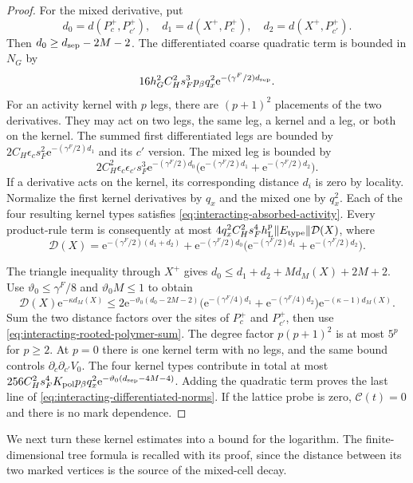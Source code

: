 \begin{proof}
For the mixed derivative, put
\[
 d_0=d(P_c^+,P_{c'}^+),\quad
 d_1=d(X^+,P_c^+),\quad d_2=d(X^+,P_{c'}^+).
\]
Then $d_0\ge d_{\rm sep}-2M-2$.
The differentiated coarse quadratic term is
bounded in $N_G$ by
\[
 16h_G^2C_H^2s_F^3p_\beta q_x^2
                                      \mathrm e^{-(\gamma^F/2)d_{\rm sep}}.
\]
For an activity kernel with $p$ legs, there
are $(p+1)^2$ placements of the two derivatives.
They may act on two legs, the same leg, a
kernel and a leg, or both on the kernel.
The summed first differentiated legs are
bounded by $2C_H\epsilon_cs_F^2\mathrm e^{-(\gamma^F/2)d_1}$
and its $c'$ version. The mixed leg is
bounded by
\[
 2C_H^2\epsilon_c\epsilon_{c'}s_F^3\mathrm e^{-(\gamma^F/2)d_0}
       \bigl(\mathrm e^{-(\gamma^F/2)d_1}+\mathrm e^{-(\gamma^F/2)d_2}\bigr).
\]
If a derivative acts on the kernel, its
corresponding distance $d_i$ is zero by
locality. Normalize the first kernel
derivatives by $q_x$ and the mixed one by
$q_x^2$. Each of the four resulting kernel
types satisfies \eqref{eq:interacting-absorbed-activity}.
Every product-rule term is consequently at most
$4q_x^2C_H^2s_F^4h_{\rm L}^p\|E_{\rm type}\|\mathcal D(X)$,
where
\[
 \mathcal D(X)=\mathrm e^{-(\gamma^F/2)(d_1+d_2)}
       +\mathrm e^{-(\gamma^F/2)d_0}
                  \bigl(\mathrm e^{-(\gamma^F/2)d_1}+\mathrm e^{-(\gamma^F/2)d_2}\bigr).
\]

The triangle inequality through $X^+$ gives
$d_0\le d_1+d_2+M d_M(X)+2M+2$.
Use $\vartheta_0\le\gamma^F/8$ and
$\vartheta_0M\le1$ to obtain
\[
 \mathcal D(X)\mathrm e^{-\kappa d_M(X)}
 \le2\mathrm e^{-\vartheta_0(d_0-2M-2)}
       \bigl(\mathrm e^{-(\gamma^F/4)d_1}+\mathrm e^{-(\gamma^F/4)d_2}\bigr)
                                \mathrm e^{-(\kappa-1)d_M(X)}.
\]
Sum the two distance factors over the sites
of $P_c^+$ and $P_{c'}^+$, then use
\eqref{eq:interacting-rooted-polymer-sum}.
The degree factor $p(p+1)^2$ is at most
$5^p$ for $p\ge2$. At $p=0$ there is
one kernel term with no legs, and the same
bound controls $\partial_c\partial_{c'}V_0$.
The four kernel types contribute in total
at most
$256C_H^2s_F^4K_{\mathrm{pol}}p_\beta q_x^2
\mathrm e^{-\vartheta_0(d_{\rm sep}-4M-4)}$.
Adding the quadratic term proves the last
line of \eqref{eq:interacting-differentiated-norms}.
If the lattice probe is zero, $\mathscr C(t)=0$
and there is no mark dependence.
\end{proof}

We next turn these kernel estimates into a bound
for the logarithm. The finite-dimensional tree
formula is recalled with its proof, since the
distance between its two marked vertices is
the source of the mixed-cell decay.

